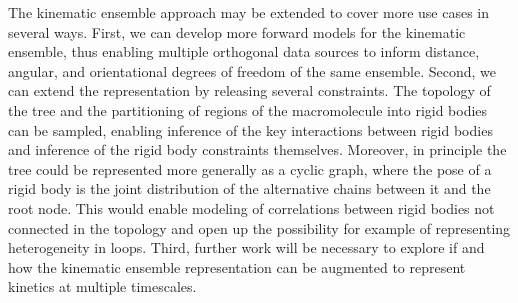 \documentclass[../../main.tex]{subfiles}
\begin{document}
\begin{refsection}
	The kinematic ensemble approach may be extended to cover more use cases in several ways.
	First, we can develop more forward models for the kinematic ensemble, thus enabling multiple orthogonal data sources to inform distance, angular, and orientational degrees of freedom of the same ensemble.
	Second, we can extend the representation by releasing several constraints.
	The topology of the tree and the partitioning of regions of the macromolecule into rigid bodies can be sampled, enabling inference of the key interactions between rigid bodies and inference of the rigid body constraints themselves.
	Moreover, in principle the tree could be represented more generally as a cyclic graph, where the pose of a rigid body is the joint distribution of the alternative chains between it and the root node.
	This would enable modeling of correlations between rigid bodies not connected in the topology and open up the possibility for example of representing heterogeneity in loops.
	Third, further work will be necessary to explore if and how the kinematic ensemble representation can be augmented to represent kinetics at multiple timescales.

	\clearpage
	\printbibliography[heading=subbibintoc]
\end{refsection}
\end{document}
